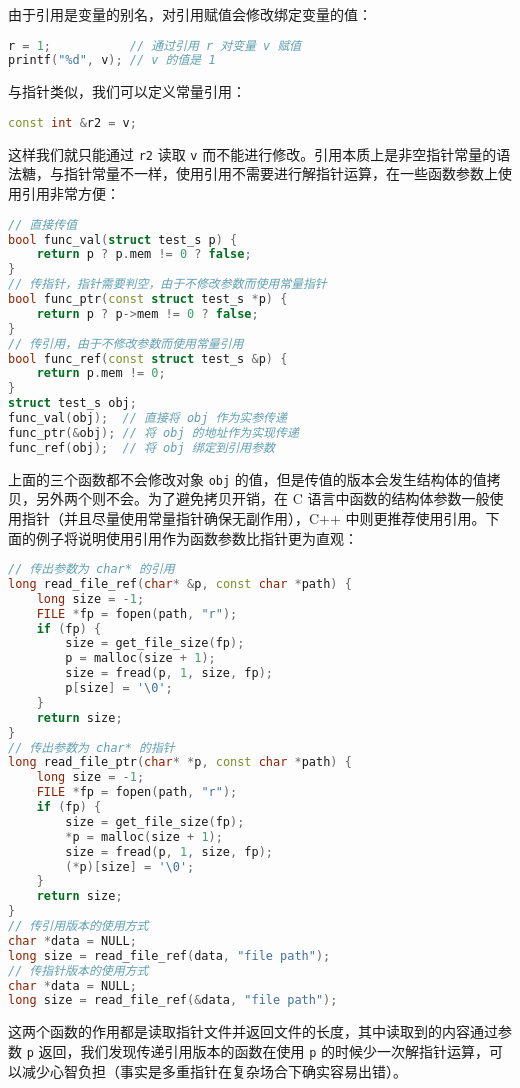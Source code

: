 \documentclass[hyperref,UTF8]{article}
\begin{document}
由于引用是变量的别名，对引用赋值会修改绑定变量的值：
\begin{lstlisting}[language=c++]
r = 1;           // 通过引用 r 对变量 v 赋值
printf("%d", v); // v 的值是 1
\end{lstlisting}
与指针类似，我们可以定义常量引用：
\begin{lstlisting}[language=c++,numbers=none]
const int &r2 = v;
\end{lstlisting}
这样我们就只能通过 \texttt{r2} 读取 \texttt{v} 而不能进行修改。引用本质上是非空指针常量的语法糖，与指针常量不一样，使用引用不需要进行解指针运算，在一些函数参数上使用引用非常方便：
\begin{lstlisting}[language=c++]
// 直接传值
bool func_val(struct test_s p) {
    return p ? p.mem != 0 ? false;
}
// 传指针，指针需要判空，由于不修改参数而使用常量指针
bool func_ptr(const struct test_s *p) {
    return p ? p->mem != 0 ? false;
}
// 传引用，由于不修改参数而使用常量引用
bool func_ref(const struct test_s &p) {
    return p.mem != 0;
}
struct test_s obj;
func_val(obj);  // 直接将 obj 作为实参传递
func_ptr(&obj); // 将 obj 的地址作为实现传递
func_ref(obj);  // 将 obj 绑定到引用参数
\end{lstlisting}
上面的三个函数都不会修改对象 \texttt{obj} 的值，但是传值的版本会发生结构体的值拷贝，另外两个则不会。为了避免拷贝开销，在 C 语言中函数的结构体参数一般使用指针（并且尽量使用常量指针确保无副作用），C++ 中则更推荐使用引用。下面的例子将说明使用引用作为函数参数比指针更为直观：
\begin{lstlisting}[language=c++]
// 传出参数为 char* 的引用
long read_file_ref(char* &p, const char *path) {
    long size = -1;
    FILE *fp = fopen(path, "r");
    if (fp) {
        size = get_file_size(fp);
        p = malloc(size + 1);
        size = fread(p, 1, size, fp);
        p[size] = '\0';
    }
    return size;
}
// 传出参数为 char* 的指针
long read_file_ptr(char* *p, const char *path) {
    long size = -1;
    FILE *fp = fopen(path, "r");
    if (fp) {
        size = get_file_size(fp);
        *p = malloc(size + 1);
        size = fread(p, 1, size, fp);
        (*p)[size] = '\0';
    }
    return size;
}
// 传引用版本的使用方式
char *data = NULL;
long size = read_file_ref(data, "file path");
// 传指针版本的使用方式
char *data = NULL;
long size = read_file_ref(&data, "file path");
\end{lstlisting}
这两个函数的作用都是读取指针文件并返回文件的长度，其中读取到的内容通过参数 \texttt{p} 返回，我们发现传递引用版本的函数在使用 \texttt{p} 的时候少一次解指针运算，可以减少心智负担（事实是多重指针在复杂场合下确实容易出错）。
\end{document}
